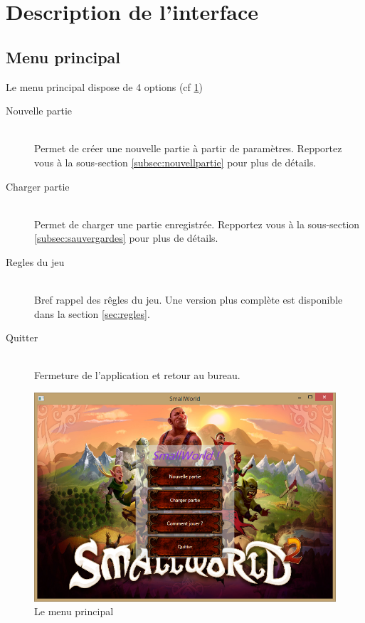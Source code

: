 ﻿\section{Description de l'interface}
	\subsection{Menu principal}
		Le menu principal dispose de 4 options (cf \ref{fig:menuPrinc})
		
		\begin{description}
			\item[Nouvelle partie] \hfill \\
				Permet de créer une nouvelle partie à partir de paramètres. Repportez vous à la sous-section \ref{subsec:nouvellpartie} pour plus de détails.
			\item[Charger partie] \hfill \\
				Permet de charger une partie enregistrée. Repportez vous à la sous-section \ref{subsec:sauvergardes} pour plus de détails.
			\item[Regles du jeu] \hfill \\
				Bref rappel des rêgles du jeu. Une version plus complète est disponible dans la section \ref{sec:regles}.
			\item[Quitter] \hfill \\
				Fermeture de l'application et retour au bureau.
		\end{description}
		
		\begin{figure}[h!]
			\caption{Le menu principal}
			\label{fig:menuPrinc}
			\centering
			\includegraphics[width=\textwidth]{res/main_menu}
		\end{figure}
	
